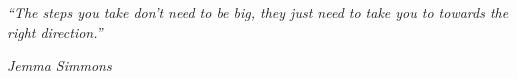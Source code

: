 \setlength{}
\setlength\epigraphrule{0pt}
\thispagestyle{empty}
\vspace*{\fill}
\epigraph{\itshape \textit{``The steps you take don't need to be big, they just need to take you to towards the right direction.''}}{\textit{Jemma Simmons}}
